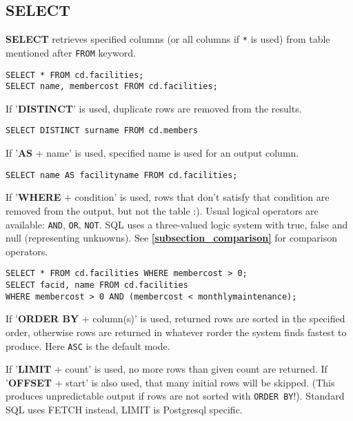 %

\subsection{SELECT}
\textbf{SELECT} retrieves specified columns (or all columns if \texttt{*} is used) from table mentioned after \texttt{FROM} keyword.
\begin{verbatim}
SELECT * FROM cd.facilities;
SELECT name, membercost FROM cd.facilities;
\end{verbatim}

If '\textbf{DISTINCT}' is used, duplicate rows are removed from the results.
\begin{verbatim}
SELECT DISTINCT surname FROM cd.members
\end{verbatim}

If '\textbf{AS} + name' is used, specified name is used for an output column.
\begin{verbatim}
SELECT name AS facilityname FROM cd.facilities;
\end{verbatim}

If '\textbf{WHERE} + condition' is used, rows that don't satisfy that condition are removed from the output, but not the table :).
Usual logical operators are available: \texttt{AND}, \texttt{OR}, \texttt{NOT}.
SQL uses a three-valued logic system with true, false and null (representing unknowns).
See \textbf{\ref{subsection_comparison}} for comparison operators.
\begin{verbatim}
SELECT * FROM cd.facilities WHERE membercost > 0;
SELECT facid, name FROM cd.facilities
WHERE membercost > 0 AND (membercost < monthlymaintenance);
\end{verbatim}

If '\textbf{ORDER BY} + column(s)' is used, returned rows are sorted in the specified order, otherwise rows are returned in whatever rorder the system finds fastest to produce.
Here \texttt{ASC} is the default mode.

If '\textbf{LIMIT} + count' is used, no more rows than given count are returned.
If '\textbf{OFFSET} + start' is also used, that many initial rows will be skipped.
(This produces unpredictable output if rows are not sorted with \texttt{ORDER BY}!).
Standard SQL uses FETCH instead, LIMIT is Postgresql specific.

